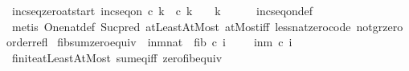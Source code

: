 \begin{isabellebody}
\endisatagproof
{\isafoldproof}%
%
\isadelimproof
\isanewline
%
\endisadelimproof
\isanewline
{}\isamarkupfalse%
\ inc{\isacharunderscore}{\kern0pt}seq{\isacharunderscore}{\kern0pt}zero{\isacharunderscore}{\kern0pt}at{\isacharunderscore}{\kern0pt}start{\isacharcolon}{\kern0pt}\ {\isachardoublequoteopen}inc{\isacharunderscore}{\kern0pt}seq{\isacharunderscore}{\kern0pt}on\ c\ {\isacharbraceleft}{\kern0pt}{}{\isachardot}{\kern0pt}{\isachardot}{\kern0pt}k{\isacharminus}{\kern0pt}{}{\isacharbraceright}{\kern0pt}\ {\isasymLongrightarrow}\ c\ k\ {\isacharequal}{\kern0pt}\ {}\ {\isasymLongrightarrow}\ k\ {\isacharequal}{\kern0pt}\ {}{\isachardoublequoteclose}\isanewline
%
\isadelimproof
\ \ %
\endisadelimproof
%
\isatagproof
{}\isamarkupfalse%
\ inc{\isacharunderscore}{\kern0pt}seq{\isacharunderscore}{\kern0pt}on{\isacharunderscore}{\kern0pt}def\isanewline
\ \ \isamarkupfalse%
\ {\isacharparenleft}{\kern0pt}metis\ One{\isacharunderscore}{\kern0pt}nat{\isacharunderscore}{\kern0pt}def\ Suc{\isacharunderscore}{\kern0pt}pred\ atLeast{}AtMost\ atMost{\isacharunderscore}{\kern0pt}iff\ less{\isacharunderscore}{\kern0pt}nat{\isacharunderscore}{\kern0pt}zero{\isacharunderscore}{\kern0pt}code\ not{\isacharunderscore}{\kern0pt}gr{\isacharunderscore}{\kern0pt}zero\ order{\isachardot}{\kern0pt}refl{\isacharparenright}{\kern0pt}%
\endisatagproof
{\isafoldproof}%
%
\isadelimproof
\isanewline
%
\endisadelimproof
\isanewline
{}\isamarkupfalse%
\ fib{\isacharunderscore}{\kern0pt}sum{\isacharunderscore}{\kern0pt}zero{\isacharunderscore}{\kern0pt}equiv{\isacharcolon}{\kern0pt}\ {\isachardoublequoteopen}{\isacharparenleft}{\kern0pt}{\isasymSum}\ i{\isacharequal}{\kern0pt}n{\isachardot}{\kern0pt}{\isachardot}{\kern0pt}m{\isacharcolon}{\kern0pt}{\isacharcolon}{\kern0pt}nat\ {\isachardot}{\kern0pt}\ fib\ {\isacharparenleft}{\kern0pt}c\ i{\isacharparenright}{\kern0pt}{\isacharparenright}{\kern0pt}\ {\isacharequal}{\kern0pt}\ {}\ {\isasymlongleftrightarrow}\ {\isacharparenleft}{\kern0pt}{\isasymforall}\ i{\isasymin}{\isacharbraceleft}{\kern0pt}n{\isachardot}{\kern0pt}{\isachardot}{\kern0pt}m{\isacharbraceright}{\kern0pt}{\isachardot}{\kern0pt}\ c\ i\ {\isacharequal}{\kern0pt}\ {}{\isacharparenright}{\kern0pt}{\isachardoublequoteclose}\isanewline
%
\isadelimproof
\ \ %
\endisadelimproof
%
\isatagproof
{}\isamarkupfalse%
\ finite{\isacharunderscore}{\kern0pt}atLeastAtMost\ sum{\isacharunderscore}{\kern0pt}eq{\isacharunderscore}{\kern0pt}{}{\isacharunderscore}{\kern0pt}iff\ zero{\isacharunderscore}{\kern0pt}fib{\isacharunderscore}{\kern0pt}equiv\ \isamarkupfalse%

\end{isabellebody}
